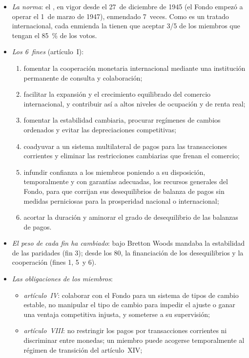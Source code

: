 \documentclass[11pt]{article}
\begin{document}
\begin{itemize}
\item \emph{La norma}: el , en vigor desde el 27~de diciembre de 1945 (el Fondo empezó a operar el 1~de marzo de 1947), enmendado 7~veces. Como es un tratado internacional, cada enmienda la tienen que aceptar 3/5 de los miembros que tengan el 85~\% de los votos\nocite{FMIConvenio}.
\item \emph{Los 6~fines} (artículo~I):
  \begin{enumerate}
  \item fomentar la cooperación monetaria internacional mediante una institución permanente de consulta y colaboración;
  \item facilitar la expansión y el crecimiento equilibrado del comercio internacional, y contribuir así a altos niveles de ocupación y de renta real;
  \item fomentar la estabilidad cambiaria, procurar regímenes de cambios ordenados y evitar las depreciaciones competitivas;
  \item coadyuvar a un sistema multilateral de pagos para las transacciones corrientes y eliminar las restricciones cambiarias que frenan el comercio;
  \item infundir confianza a los miembros poniendo a su disposición, temporalmente y con garantías adecuadas, los recursos generales del Fondo, para que corrijan sus desequilibrios de balanza de pagos sin medidas perniciosas para la prosperidad nacional o internacional;
  \item acortar la duración y aminorar el grado de desequilibrio de las balanzas de pagos.
  \end{enumerate}
\item \emph{El peso de cada fin ha cambiado}: bajo Bretton Woods mandaba la estabilidad de las paridades (fin 3); desde los 80, la financiación de los desequilibrios y la cooperación (fines 1, 5~y 6).
\item \emph{Las obligaciones de los miembros}:
  \begin{itemize}
  \item \emph{artículo~IV}: colaborar con el Fondo para un sistema de tipos de cambio estable, no manipular el tipo de cambio para impedir el ajuste o ganar una ventaja competitiva injusta, y someterse a su supervisión;
  \item \emph{artículo~VIII}: no restringir los pagos por transacciones corrientes ni discriminar entre monedas; un miembro puede acogerse temporalmente al régimen de transición del artículo~XIV;

\end{itemize}
\end{itemize}
\end{document}
